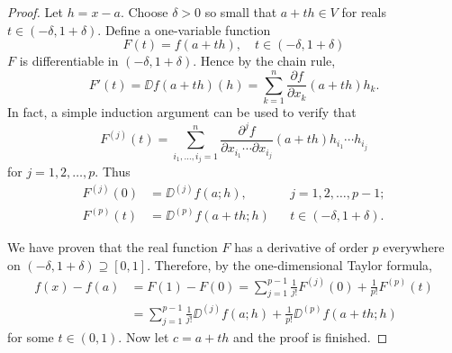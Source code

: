 \documentclass[11pt]{article}
\begin{document}
\begin{proof}
  Let $h = x - a$.  Choose $\delta > 0$ so small that $a + t h \in V$ for reals $t \in (-\delta, 1 + \delta)$.  Define a one-variable function
  \[
    F(t) = f(a+th), \quad t \in (-\delta, 1 + \delta)
  \]
  $F$ is differentiable in $(-\delta, 1+\delta)$.  Hence by the chain rule,
  \[
    F'(t) = \DD f(a+th)(h) = \sum_{k=1}^n \frac{\partial f}{\partial x_k} (a + th) h_k.
  \]
  In fact, a simple induction argument can be used to verify that
  \[
    F^{(j)}(t) = \sum_{i_1, \dots, i_j=1}^n \frac{\partial^j f}{\partial x_{i_1} \cdots \partial x_{i_j}} (a + th) h_{i_1} \cdots h_{i_j}
  \]
  for $j = 1, 2, \dots, p$.  Thus
  \begin{align*}
    F^{(j)}(0) &= \DD^{(j)} f(a;h), && j = 1, 2, \dots, p-1; \\
    F^{(p)}(t) &= \DD^{(p)} f(a+th; h) && t \in (-\delta, 1+\delta).
  \end{align*}
  
  We have proven that the real function $F$ has a derivative of order $p$ everywhere on $(-\delta, 1+\delta) \supseteq [0,1]$.  Therefore, by the one-dimensional Taylor formula,
  \begin{align*}
    f(x) - f(a) &= F(1) - F(0) = \sum_{j=1}^{p-1} \frac{1}{j!} F^{(j)}(0) + \frac{1}{p!} F^{(p)}(t) \\
    &= \sum_{j=1}^{p-1} \frac{1}{j!} \DD^{(j)} f(a;h) + \frac{1}{p!} \DD^{(p)} f(a+th; h)
  \end{align*}
  for some $t \in (0,1)$.  Now let $c = a + th$ and the proof is finished.
\end{proof}
\end{document}
